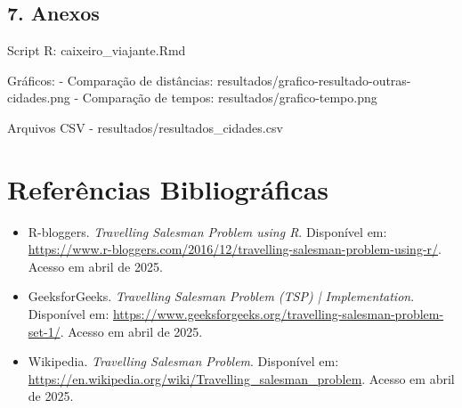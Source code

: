 \documentclass[
]{article}
\begin{document}
\hypertarget{anexos}{%
\subsection{7. Anexos}\label{anexos}}

Script R: caixeiro\_viajante.Rmd

Gráficos: - Comparação de distâncias:
resultados/grafico-resultado-outras-cidades.png - Comparação de tempos:
resultados/grafico-tempo.png

Arquivos CSV - resultados/resultados\_cidades.csv

\section*{Referências Bibliográficas}

\begin{itemize}
    \item R-bloggers. \textit{Travelling Salesman Problem using R}. Disponível em: \url{https://www.r-bloggers.com/2016/12/travelling-salesman-problem-using-r/}. Acesso em abril de 2025.
    
    \item GeeksforGeeks. \textit{Travelling Salesman Problem (TSP) | Implementation}. Disponível em: \url{https://www.geeksforgeeks.org/travelling-salesman-problem-set-1/}. Acesso em abril de 2025.
    
    \item Wikipedia. \textit{Travelling Salesman Problem}. Disponível em: \url{https://en.wikipedia.org/wiki/Travelling_salesman_problem}. Acesso em abril de 2025.
\end{itemize}
\end{document}
